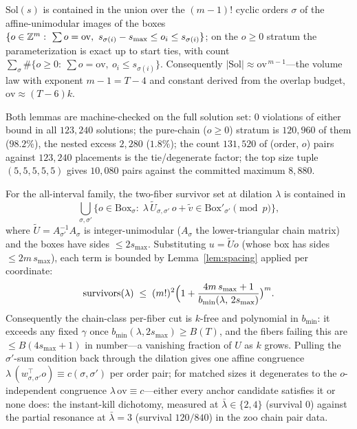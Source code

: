 \begin{lemma}\label{lem:chainbox}
$\mathrm{Sol}(s)$ is contained in the union over the $(m-1)!$ cyclic
orders $\sigma$ of the affine-unimodular images of the boxes
$\{o\in\Z^m:\ \sum o=\mathrm{ov},\ s_{\sigma(i)}-s_{\max}\le o_i\le
s_{\sigma(i)}\}$; on the $o\ge0$ stratum the parameterization is exact
up to start ties, with count
$\sum_\sigma\#\{o\ge0:\ \sum o=\mathrm{ov},\ o_i\le s_{\sigma(i)}\}$.
Consequently $|\mathrm{Sol}|\approx\mathrm{ov}^{\,m-1}$---the volume
law with exponent $m-1=T-4$ and constant derived from the overlap
budget, $\mathrm{ov}\approx(T-6)k$.
\end{lemma}

Both lemmas are machine-checked on the full solution set: $0$
violations of either bound in all $123{,}240$ solutions; the pure-chain
($o\ge0$) stratum is $120{,}960$ of them ($98.2\%$), the nested excess
$2{,}280$ ($1.8\%$); the count $131{,}520$ of (order, $o$) pairs
against $123{,}240$ placements is the tie/degenerate factor; the top
size tuple $(5,5,5,5,5)$ gives $10{,}080$ pairs against the committed
maximum $8{,}880$.

\begin{theorem}\label{thm:chaindilate}
For the all-interval family, the two-fiber survivor set at dilation
$\lambda$ is contained in
\[
\bigcup_{\sigma,\sigma'}\bigl\{o\in\mathrm{Box}_\sigma:\;
\lambda\,\tilde U_{\sigma,\sigma'}\,o+\tilde v\in
\mathrm{Box}'_{\sigma'}\pmod p\bigr\},
\]
where $\tilde U=A_{\sigma'}^{-1}A_\sigma$ is integer-unimodular
($A_\sigma$ the lower-triangular chain matrix) and the boxes have
sides $\le 2s_{\max}$. Substituting $u=\tilde Uo$ (whose box has sides
$\le 2m\,s_{\max}$), each term is bounded by
Lemma~\ref{lem:spacing} applied per coordinate:
\[
\mathrm{survivors}(\lambda)\;\le\;(m!)^2
\Bigl(1+\frac{4m\,s_{\max}+1}{b_{\min}(\lambda,\,2s_{\max})}\bigr)^{m}.
\]
Consequently the chain-class per-fiber cut is $k$-free and polynomial
in $b_{\min}$: it exceeds any fixed $\gamma$ once
$b_{\min}(\lambda,2s_{\max})\ge B(T)$, and the fibers failing this are
$\le B(4s_{\max}+1)$ in number---a vanishing fraction of $U$ as $k$
grows. Pulling the $\sigma'$-sum condition back through the dilation
gives one affine congruence
$\lambda\,(w^\top_{\sigma,\sigma'}o)\equiv c(\sigma,\sigma')$ per
order pair; for matched sizes it degenerates to the $o$-independent
congruence $\lambda\,\mathrm{ov}\equiv c$---either every anchor
candidate satisfies it or none does: the instant-kill dichotomy,
measured at $\bar\lambda\in\{2,4\}$ (survival $0$) against the partial
resonance at $\bar\lambda=3$ (survival $120/840$) in the zoo chain pair
data.
\end{theorem}

